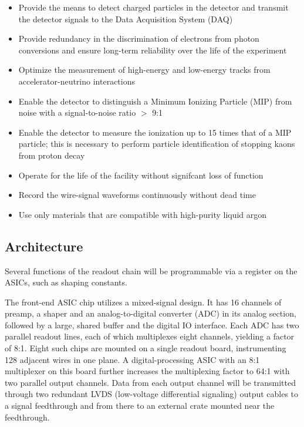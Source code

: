 \begin{itemize}	
\item Provide the means to detect charged particles in the detector and transmit the detector signals to the
Data Acquisition System (DAQ)
\item Provide redundancy in the discrimination of electrons from photon conversions and ensure long-term reliability
over the life of the experiment
\item Optimize the measurement of high-energy and low-energy tracks from accelerator-neutrino interactions
\item Enable the detector to distinguish a Minimum Ionizing Particle (MIP) from noise with a signal-to-noise ratio $>$ 9:1
\item Enable the detector to measure the ionization up to 15 times that of a MIP particle;
this is necessary to perform particle identification of stopping kaons from proton decay
\item Operate for the life of the facility without signifcant loss of function
\item Record the wire-signal waveforms continuously without dead time
\item Use only materials that are compatible with high-purity liquid argon

\end{itemize}



\subsection{Architecture}
\label{subsec:fe-arch}

Several functions of the readout chain will be programmable via a register on the ASICs,
such as shaping constants.

The front-end ASIC chip utilizes a mixed-signal design.  
It has 16 channels of preamp, a shaper and an analog-to-digital converter (ADC) in its analog section,  
followed by a large, shared buffer and the digital IO interface.
Each ADC has two parallel readout lines, each of which multiplexes eight channels, yielding a factor of 8:1.
Eight such chips are mounted on a single readout board, instrumenting 128 adjacent wires in one plane. 
A digital-processing ASIC with an 8:1 multiplexer on this board further 
increases the multiplexing factor to 64:1 with two parallel output channels.
Data from each output channel will be transmitted through two redundant LVDS (low-voltage differential signaling)
output cables to a signal feedthrough and from there to an external crate mounted near the feedthrough.


